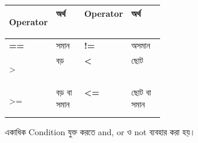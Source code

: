 \begin{tabularx}
{\linewidth}
{
|>{\bfseries\centering\arraybackslash}p{0.15\linewidth}
|Y
|>{\bfseries\centering\arraybackslash}p{0.15\linewidth}
|Y|
}

\hline
{}

\textbf{Operator}
&
\textbf{অর্থ}
&
\textbf{Operator}
&
\textbf{অর্থ}
\\
\hline

\textenglish{\ttfamily ==}
&
সমান
&
\textenglish{\ttfamily !=}
&
অসমান
\\
\hline

\textenglish{\ttfamily >}
&
বড়
&
\textenglish{\ttfamily <}
&
ছোট
\\
\hline

\textenglish{\ttfamily >=}
&
বড় বা সমান
&
\textenglish{\ttfamily <=}
&
ছোট বা সমান
\\
\hline

\end{tabularx}

একাধিক Condition যুক্ত করতে
\textenglish{\ttfamily and},
\textenglish{\ttfamily or}
ও
\textenglish{\ttfamily not}
ব্যবহার করা হয়।

